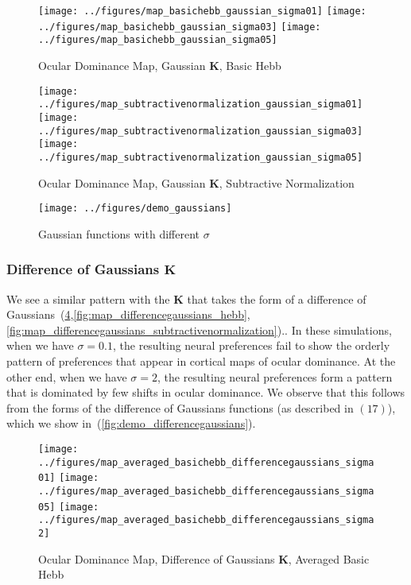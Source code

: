 \documentclass[pageno]{mat323paper}
\begin{document}
\begin{figure}[h]
\texttt{[image: ../figures/map\_basichebb\_gaussian\_sigma01]}
\texttt{[image: ../figures/map\_basichebb\_gaussian\_sigma03]}
\texttt{[image: ../figures/map\_basichebb\_gaussian\_sigma05]}
\caption{Ocular Dominance Map, Gaussian $\mathbf{K}$, Basic Hebb}
\label{fig:map_gaussian_hebb}
\end{figure}

\begin{figure}[h]
\texttt{[image: ../figures/map\_subtractivenormalization\_gaussian\_sigma01]}
\texttt{[image: ../figures/map\_subtractivenormalization\_gaussian\_sigma03]}
\texttt{[image: ../figures/map\_subtractivenormalization\_gaussian\_sigma05]}
\caption{Ocular Dominance Map, Gaussian $\mathbf{K}$, Subtractive Normalization}
\label{fig:map_gaussian_subtractivenormalization}
\end{figure}

\begin{figure}[h]
\centering
\texttt{[image: ../figures/demo\_gaussians]}
\caption{Gaussian functions with different $\sigma$}
\label{fig:demo_gaussians}
\end{figure}

\subsubsection{Difference of Gaussians $\mathbf{K}$}
We see a similar pattern with the $\mathbf{K}$ that takes the form of a difference of Gaussians~(\ref{fig:map_differencegaussians_averagedhebb},\ref{fig:map_differencegaussians_hebb},\ref{fig:map_differencegaussians_subtractivenormalization}).. In these simulations, when we have $\sigma=0.1$, the resulting neural preferences fail to show the orderly pattern of preferences that appear in cortical maps of ocular dominance. At the other end, when we have $\sigma=2$, the resulting neural preferences form a pattern that is dominated by few shifts in ocular dominance. We observe that this follows from the forms of the difference of Gaussians functions (as described in $(17)$), which we show in~(\ref{fig:demo_differencegaussians}).

\begin{figure}[h]
\texttt{[image: ../figures/map\_averaged\_basichebb\_differencegaussians\_sigma01]}
\texttt{[image: ../figures/map\_averaged\_basichebb\_differencegaussians\_sigma05]}
\texttt{[image: ../figures/map\_averaged\_basichebb\_differencegaussians\_sigma2]}
\caption{Ocular Dominance Map, Difference of Gaussians $\mathbf{K}$, Averaged Basic Hebb}
\label{fig:map_differencegaussians_averagedhebb}
\end{figure}
\end{document}
